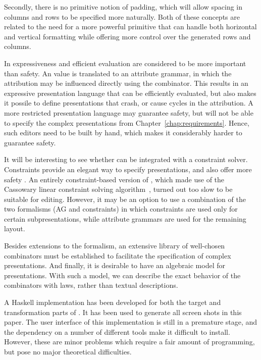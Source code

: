 \bc Secondly, there is no primitive notion of padding, which will allow spacing in columns and rows to be specified more naturally. Both of these concepts are related to the need for a more powerful  primitive that can handle both horizontal and vertical formatting while offering more control over the generated rows and columns. 
\ec

In {\Xprez}  expressiveness and efficient evaluation are considered to be more important than safety. An {\Xprez} value is translated to an attribute grammar, in which the attribution may be influenced directly using the   combinator. This results in an expressive presentation language that can be efficiently evaluated, but also makes it possile to define presentations that crash, or cause cycles in the attribution.  A more restricted presentation language may guarantee safety, but will not be able to specify the complex presentations from Chapter~\ref{chap:requirements}. Hence, such editors need to be built by hand, which makes it considerably harder to guarantee safety.


It will be interesting to see whether {\Xprez} can be integrated with a constraint solver. Constraints provide an elegant way to specify presentations, and also offer more safety . An entirely constraint-based version of {\Xprez}, which made use of the Cassowary linear constraint solving algorithm~\cite{badros01cassowary}, turned out too slow to be suitable for editing. However, it may be an option to use  a combination of the two formalisms (AG and constraints) in which constraints are used only for certain subpresentations, while attribute grammars are used for the remaining layout.

Besides extensions to the {\Xprez} formalism, an extensive library of well-chosen combinators must be established to facilitate the specification of complex presentations. And finally, it is desirable to have an algebraic model for {\Xprez} presentations. With such a model, we can describe the  exact behavior of the combinators with laws, rather than textual descriptions.



\bc
A Haskell implementation has been developed for both the target and transformation parts of {\Xprez}. It has been used to generate all screen shots in this paper. The user interface of this implementation is still in a premature stage, and the dependency on a number of different tools make it difficult to install. However, these are minor problems which require a fair amount of programming, but pose no major theoretical difficulties. 
\ec

